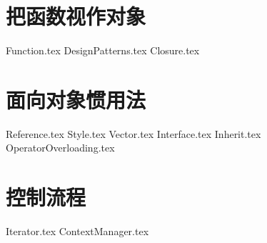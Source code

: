 \documentclass{PionpillNote-book}
\begin{document}
\chapter{把函数视作对象}
{Function.tex}
{DesignPatterns.tex}
{Closure.tex}

\chapter{面向对象惯用法}
{Reference.tex}
{Style.tex}
{Vector.tex}
{Interface.tex}
{Inherit.tex}
{OperatorOverloading.tex}

\chapter{控制流程}
{Iterator.tex}
{ContextManager.tex}
\end{document}
